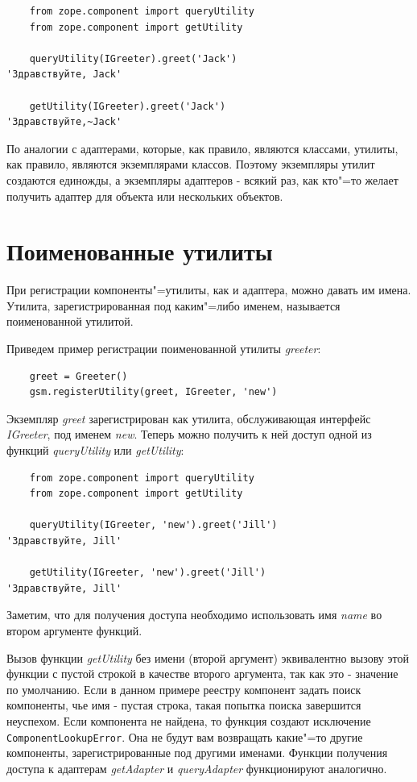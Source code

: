 \documentclass[a4paper,openany,twoside,draft]{book}
\providecommand*{\DUroletitlereference}[1]{\textsl{#1}}
\begin{document}
\begin{verbatim}
    from zope.component import queryUtility
    from zope.component import getUtility

    queryUtility(IGreeter).greet('Jack')
'Здравствуйте, Jack'

    getUtility(IGreeter).greet('Jack')
'Здравствуйте,~Jack'
\end{verbatim}

По аналогии с адаптерами, которые, как правило, являются классами, утилиты, как правило, являются экземплярами классов.  Поэтому экземпляры утилит создаются единожды, а экземпляры адаптеров - всякий раз, как кто"=то желает получить адаптер для объекта или нескольких объектов.


\section{Поименованные утилиты%
  \label{id42}%
}

При регистрации компоненты"=утилиты, как и адаптера, можно давать им имена.  Утилита, зарегистрированная под каким"=либо именем, называется поименованной утилитой.

Приведем пример регистрации поименованной утилиты \DUroletitlereference{greeter}:

\begin{verbatim}
    greet = Greeter()
    gsm.registerUtility(greet, IGreeter, 'new')
\end{verbatim}

Экземпляр \DUroletitlereference{greet} зарегистрирован как утилита, обслуживающая интерфейс \DUroletitlereference{IGreeter}, под именем \DUroletitlereference{new}.  Теперь можно получить к ней доступ одной из функций \DUroletitlereference{queryUtility} или \DUroletitlereference{getUtility}:

\begin{verbatim}
    from zope.component import queryUtility
    from zope.component import getUtility

    queryUtility(IGreeter, 'new').greet('Jill')
'Здравствуйте, Jill'

    getUtility(IGreeter, 'new').greet('Jill')
'Здравствуйте, Jill'
\end{verbatim}

Заметим, что для получения доступа необходимо использовать имя \DUroletitlereference{name} во втором аргументе функций.

Вызов функции \DUroletitlereference{getUtility} без имени (второй аргумент) эквивалентно вызову этой функции с пустой строкой в качестве второго аргумента, так как это - значение по умолчанию.  Если в данном примере реестру компонент задать поиск компоненты, чье имя - пустая строка, такая попытка поиска завершится неуспехом.  Если компонента не найдена, то функция создают исключение \texttt{ComponentLookupError}.  Она не будут вам возвращать какие"=то другие компоненты, зарегистрированные под другими именами.  Функции получения доступа к адаптерам \DUroletitlereference{getAdapter} и \DUroletitlereference{queryAdapter} функционируют аналогично.
\end{document}
